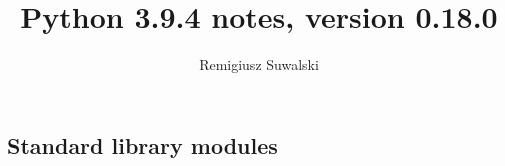 \documentclass{charun}
\title{Python 3.9.4 notes, version 0.18.0}
\author{Remigiusz Suwalski}
\begin{document}
\begin{multicols*}{2}
\maketitle
\raggedright





\section{Standard library modules}
































\end{multicols*}
\end{document}
